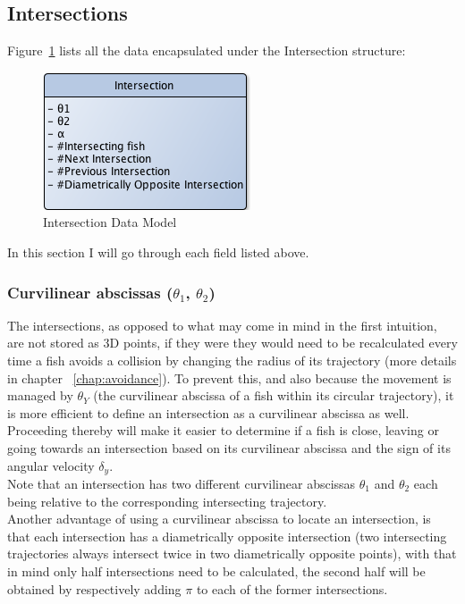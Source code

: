 \subsection{Intersections}
\label{subsec:intersections}

Figure~\ref{fig:intersection} lists all the data encapsulated under the Intersection structure:
\begin{figure}[H]
   \centering
   \includegraphics[scale=0.8]{figures/intersection.png}
   \caption{Intersection Data Model}
   \label{fig:intersection}
\end{figure}

In this section I will go through each field listed above.

\subsubsection{Curvilinear abscissas ($\theta_1$, $\theta_2$)}
The intersections, as opposed to what may come in mind in the first intuition, are not stored as 3D points, if they were they would need to be recalculated every time a fish avoids a collision by changing the radius of its trajectory (more details in chapter ~\ref{chap:avoidance}). To prevent this, and also because the movement is managed by $\theta_Y$ (the curvilinear abscissa of a fish within its circular trajectory), it is more efficient to define an intersection as a curvilinear abscissa as well. Proceeding thereby will make it easier to determine if a fish is close, leaving or going towards an intersection based on its curvilinear abscissa and the sign of its angular velocity $\delta _{y}$.\\

Note that an intersection has two different curvilinear abscissas $\theta_1$ and $\theta_2$ each being relative to the corresponding intersecting trajectory.\\

Another advantage of using a curvilinear abscissa to locate an intersection, is that each intersection has a diametrically opposite intersection (two intersecting trajectories always intersect twice in two diametrically opposite points), with that in mind only half intersections need to be calculated, the second half will be obtained by respectively adding $\pi$ to each of the former intersections.\\

